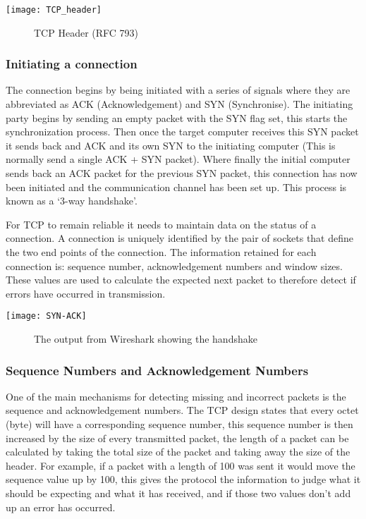 \begin{center}
	\texttt{[image: TCP\_header]}
	\begin{figure}[h]
		\caption{TCP Header (RFC 793)}
	\end{figure}	
	
\end{center}

\subsubsection*{Initiating a connection}
The connection begins by being initiated with a series of signals where they are abbreviated as ACK (Acknowledgement) and SYN (Synchronise). The initiating party begins by sending an empty packet with the SYN flag set, this starts the synchronization process. Then once the target computer receives this SYN packet it sends back and ACK and its own SYN to the initiating computer (This is normally send a single ACK + SYN packet). Where finally the initial computer sends back an ACK packet for the previous SYN packet, this connection has now been initiated and the communication channel has been set up. This process is known as a `3-way handshake'.

For TCP to remain reliable it needs to maintain data on the status of a connection. A connection is uniquely identified by the pair of sockets that define the two end points of the connection. The information retained for each connection is: sequence number, acknowledgement numbers and window sizes. These values are used to calculate the expected next packet to therefore detect if errors have occurred in transmission.

\begin{center}
	\texttt{[image: SYN-ACK]}
	\begin{figure}[h]
		\caption{The output from Wireshark showing the handshake}
	\end{figure}
\end{center}


\subsubsection*{Sequence Numbers and Acknowledgement Numbers}
One of the main mechanisms for detecting missing and incorrect packets is the sequence and acknowledgement numbers. The TCP design states that every octet (byte) will have a corresponding sequence number, this sequence number is then increased by the size of every transmitted packet, the length of a packet can be calculated by taking the total size of the packet and taking away the size of the header. For example, if a packet with a length of 100 was sent it would move the sequence value up by 100, this gives the protocol the information to judge what it should be expecting and what it has received, and if those two values don't add up an error has occurred. 

